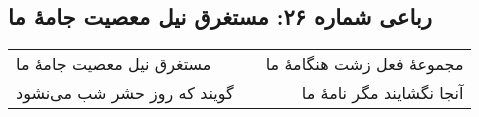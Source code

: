 \begin{center}
\section*{رباعی شماره ۲۶: مستغرق نیل معصیت جامهٔ ما}
\label{sec:sh026}
\begin{longtable}{l p{0.5cm} r}
مستغرق نیل معصیت جامهٔ ما
&&
مجموعهٔ فعل زشت هنگامهٔ ما
\\
گویند که روز حشر شب می‌نشود
&&
آنجا نگشایند مگر نامهٔ ما
\\
\end{longtable}
\end{center}
